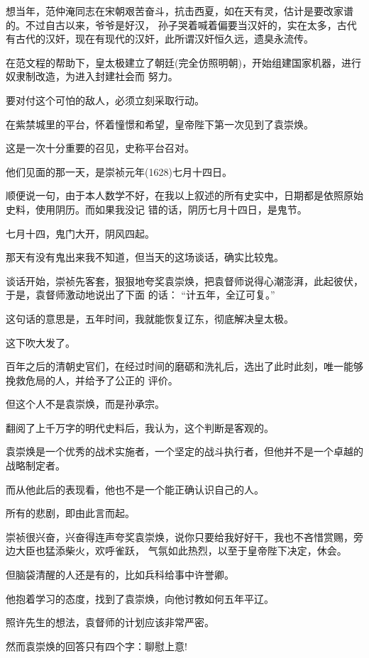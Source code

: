 \documentclass[11pt,a4paper,onecolumn]{article}
\begin{document}
想当年，范仲淹同志在宋朝艰苦奋斗，抗击西夏，如在天有灵，估计是要改家谱的。不过自古以来，爷爷是好汉，
孙子哭着喊着偏要当汉奸的，实在太多，古代有古代的汉奸，现在有现代的汉奸，此所谓汉奸恒久远，遗臭永流传。

在范文程的帮助下，皇太极建立了朝廷(完全仿照明朝)，开始组建国家机器，进行奴隶制改造，为进入封建社会而
努力。

要对付这个可怕的敌人，必须立刻采取行动。

在紫禁城里的平台，怀着憧憬和希望，皇帝陛下第一次见到了袁崇焕。

这是一次十分重要的召见，史称平台召对。

他们见面的那一天，是崇祯元年(1628)七月十四日。

顺便说一句，由于本人数学不好，在我以上叙述的所有史实中，日期都是依照原始史料，使用阴历。而如果我没记
错的话，阴历七月十四日，是鬼节。

七月十四，鬼门大开，阴风四起。

那天有没有鬼出来我不知道，但当天的这场谈话，确实比较鬼。

谈话开始，崇祯先客套，狠狠地夸奖袁崇焕，把袁督师说得心潮澎湃，此起彼伏，于是，袁督师激动地说出了下面
的话： ``计五年，全辽可复。''

这句话的意思是，五年时间，我就能恢复辽东，彻底解决皇太极。

这下吹大发了。

百年之后的清朝史官们，在经过时间的磨砺和洗礼后，选出了此时此刻，唯一能够挽救危局的人，并给予了公正的
评价。

但这个人不是袁崇焕，而是孙承宗。

翻阅了上千万字的明代史料后，我认为，这个判断是客观的。

袁崇焕是一个优秀的战术实施者，一个坚定的战斗执行者，但他并不是一个卓越的战略制定者。

而从他此后的表现看，他也不是一个能正确认识自己的人。

所有的悲剧，即由此言而起。

崇祯很兴奋，兴奋得连声夸奖袁崇焕，说你只要给我好好干，我也不吝惜赏赐，旁边大臣也猛添柴火，欢呼雀跃，
气氛如此热烈，以至于皇帝陛下决定，休会。

但脑袋清醒的人还是有的，比如兵科给事中许誉卿。

他抱着学习的态度，找到了袁崇焕，向他讨教如何五年平辽。

照许先生的想法，袁督师的计划应该非常严密。

然而袁崇焕的回答只有四个字：聊慰上意!

\section[\thesection]{}
\end{document}
